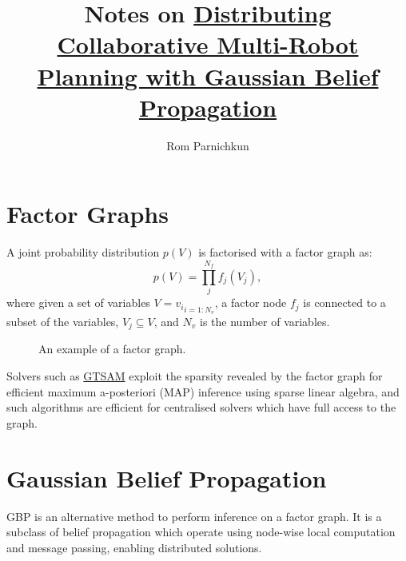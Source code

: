 \documentclass[twocolumn]{article}
\begin{document}
\title{Notes on \href{https://arxiv.org/pdf/2203.11618.pdf}{Distributing Collaborative Multi-Robot Planning with Gaussian Belief Propagation}}
\author{Rom Parnichkun}

\maketitle

\section{Factor Graphs}

A joint probability distribution $p(V)$ is factorised with a factor graph as:
\begin{equation}
    p(V) = \prod_{j}^{N_f}{f_j(V_j)},
\end{equation}
where given a set of variables $V = {v_i}_{i=1:N_v}$, a factor node $f_j$ is connected to a subset of the variables, $V_j \subseteq V$, and $N_v$ is the number of variables.

\begin{figure}[h]
\centering
{}
\caption{An example of a factor graph.}
\end{figure}

Solvers such as \href{https://gtsam.org/get_started/}{GTSAM} exploit the sparsity revealed by the factor graph for efficient maximum a-posteriori (MAP) inference using sparse linear algebra, and such algorithms are efficient for centralised solvers which have full access to the graph.

\section{Gaussian Belief Propagation}

GBP is an alternative method to perform inference on a factor graph. It is a subclass of belief propagation which operate using node-wise local computation and message passing, enabling distributed solutions.
\end{document}
